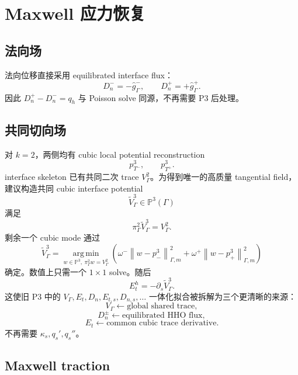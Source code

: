 \documentclass[UTF8,a4paper,11pt]{ctexart}
\newcommand{\Pp}{\mathbb{P}}
\newcommand{\argmin}{\operatorname*{arg\,min}}
\newcommand{\norm}[1]{\left\lVert #1\right\rVert}
\begin{document}
\section{Maxwell 应力恢复}

\subsection{法向场}

法向位移直接采用 equilibrated interface flux：
\[
D_n^-=-\widehat g^-_\Gamma,
\qquad
D_n^+=+\widehat g^+_\Gamma.
\]
因此 \(D_n^+-D_n^-=q_h\) 与 Poisson solve 同源，不再需要 P3 后处理。

\subsection{共同切向场}

对 \(k=2\)，两侧均有 cubic local potential reconstruction
\[
p_{T^-}^3,
\qquad
p_{T^+}^3.
\]
interface skeleton 已有共同二次 trace \(V_\Gamma^2\)。为得到唯一的高质量 tangential field，建议构造共同 cubic interface potential
\[
\widetilde V_\Gamma^3\in\Pp^3(\Gamma)
\]
满足
\begin{equation}
\boxed{
\pi_\Gamma^2\widetilde V_\Gamma^3=V_\Gamma^2.
}
\label{eq:cubic_trace_constraint}
\end{equation}
剩余一个 cubic mode 通过
\begin{equation}
\widetilde V_\Gamma^3
=\argmin_{w\in\Pp^3,\ \pi_\Gamma^2w=V_\Gamma^2}
\left(
\omega^-\norm{w-p_-^3}_{\Gamma,m}^2
+\omega^+\norm{w-p_+^3}_{\Gamma,m}^2
\right)
\label{eq:common_cubic_trace}
\end{equation}
确定。数值上只需一个 \(1\times1\) solve。随后
\begin{equation}
\boxed{E_t^h=-\partial_s\widetilde V_\Gamma^3.}
\label{eq:tangential_field}
\end{equation}
这使旧 P3 中的 \(V_\Gamma,E_t,D_n,E_{t,s},D_{n,s},\ldots\) 一体化拟合被拆解为三个更清晰的来源：
\[
V_\Gamma\leftarrow\text{global shared trace},
\]
\[
D_n^\pm\leftarrow\text{equilibrated HHO flux},
\]
\[
E_t\leftarrow\text{common cubic trace derivative}.
\]
不再需要 \(\kappa_s,q_s',q_s''\)。

\subsection{Maxwell traction}
\end{document}
